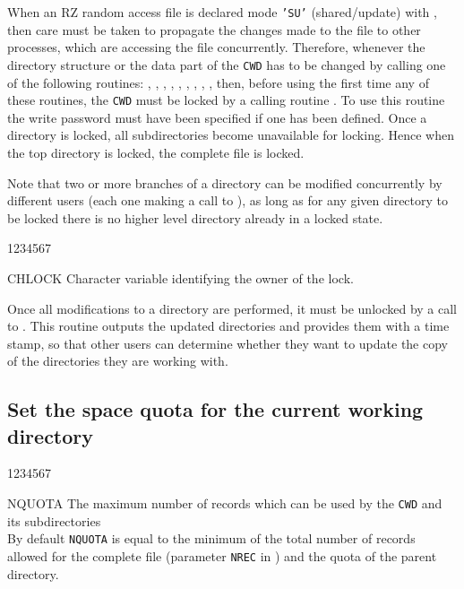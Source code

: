 When an RZ random access file is declared mode {\tt'SU'} (shared/update)
with  , then care must be taken to propagate the changes made
to the file to other processes, which are accessing the file
concurrently. Therefore, whenever the
directory structure or the data part of the {\tt CWD} has to be changed by
calling one of the following routines:
, , , ,
, , , , ,
then, before using the first time any of these routines,
the {\tt CWD} must be locked by a calling routine .
To use this routine the write
password must have been specified if one has been defined.
Once a directory is locked, all
subdirectories become unavailable for locking. Hence when the top
directory is locked, the complete file is locked.

Note that two or more branches of a directory can be modified
concurrently
by different users (each one making a call to ), as long as
for any given directory to be locked there is no higher level
directory already in a locked state.

\begin{DLtt}{1234567}
\item[CHLOCK]Character variable identifying the owner of the lock.
\end{DLtt}

Once all modifications to a directory are performed, it must
be unlocked by a call to . This routine outputs the updated
directories and provides them with a time stamp, so that other users
can determine whether they want to update the copy of the directories
they are working with.

\subsection{Set the space quota for the current working directory}
\Idesc
\begin{DLtt}{1234567}
\item[NQUOTA]The maximum number of records which can be used by the {\tt CWD}
and its subdirectories\\
By default {\tt NQUOTA} is equal to the minimum of the total number of
records allowed for the complete file (parameter {\tt NREC}
in ) and the quota of the parent directory.
\end{DLtt}

